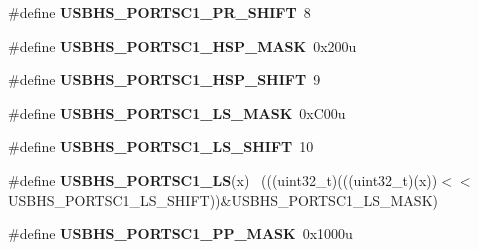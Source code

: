 \begin{DoxyCompactItemize}
\item 
\hypertarget{group___u_s_b_h_s___register___masks_gacc19c2f3863b5fafa1ae6833f641c656}{}\#define {\bfseries U\+S\+B\+H\+S\+\_\+\+P\+O\+R\+T\+S\+C1\+\_\+\+P\+R\+\_\+\+S\+H\+I\+F\+T}~8\label{group___u_s_b_h_s___register___masks_gacc19c2f3863b5fafa1ae6833f641c656}

\item 
\hypertarget{group___u_s_b_h_s___register___masks_ga43f7c6be26a8a05de28bd8e41c920dd0}{}\#define {\bfseries U\+S\+B\+H\+S\+\_\+\+P\+O\+R\+T\+S\+C1\+\_\+\+H\+S\+P\+\_\+\+M\+A\+S\+K}~0x200u\label{group___u_s_b_h_s___register___masks_ga43f7c6be26a8a05de28bd8e41c920dd0}

\item 
\hypertarget{group___u_s_b_h_s___register___masks_ga62f94eb5b80c037f016b68c7ab3a9fb4}{}\#define {\bfseries U\+S\+B\+H\+S\+\_\+\+P\+O\+R\+T\+S\+C1\+\_\+\+H\+S\+P\+\_\+\+S\+H\+I\+F\+T}~9\label{group___u_s_b_h_s___register___masks_ga62f94eb5b80c037f016b68c7ab3a9fb4}

\item 
\hypertarget{group___u_s_b_h_s___register___masks_gae079054b6738c0ba3339a5265698fbd6}{}\#define {\bfseries U\+S\+B\+H\+S\+\_\+\+P\+O\+R\+T\+S\+C1\+\_\+\+L\+S\+\_\+\+M\+A\+S\+K}~0x\+C00u\label{group___u_s_b_h_s___register___masks_gae079054b6738c0ba3339a5265698fbd6}

\item 
\hypertarget{group___u_s_b_h_s___register___masks_gabc87db9ec3c23f0cea1dbd7fcdf6f9b1}{}\#define {\bfseries U\+S\+B\+H\+S\+\_\+\+P\+O\+R\+T\+S\+C1\+\_\+\+L\+S\+\_\+\+S\+H\+I\+F\+T}~10\label{group___u_s_b_h_s___register___masks_gabc87db9ec3c23f0cea1dbd7fcdf6f9b1}

\item 
\hypertarget{group___u_s_b_h_s___register___masks_ga254a868ffa2012775bab546f990a0ae6}{}\#define {\bfseries U\+S\+B\+H\+S\+\_\+\+P\+O\+R\+T\+S\+C1\+\_\+\+L\+S}(x)                                        ~(((uint32\+\_\+t)(((uint32\+\_\+t)(x))$<$$<$U\+S\+B\+H\+S\+\_\+\+P\+O\+R\+T\+S\+C1\+\_\+\+L\+S\+\_\+\+S\+H\+I\+F\+T))\&U\+S\+B\+H\+S\+\_\+\+P\+O\+R\+T\+S\+C1\+\_\+\+L\+S\+\_\+\+M\+A\+S\+K)\label{group___u_s_b_h_s___register___masks_ga254a868ffa2012775bab546f990a0ae6}

\item 
\hypertarget{group___u_s_b_h_s___register___masks_ga266b586e5c79160269b36782944b7b68}{}\#define {\bfseries U\+S\+B\+H\+S\+\_\+\+P\+O\+R\+T\+S\+C1\+\_\+\+P\+P\+\_\+\+M\+A\+S\+K}~0x1000u\label{group___u_s_b_h_s___register___masks_ga266b586e5c79160269b36782944b7b68}


\end{DoxyCompactItemize}
